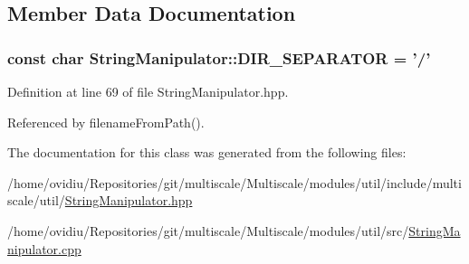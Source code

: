 \subsection{Member Data Documentation}
\hypertarget{classmultiscale_1_1StringManipulator_a3c975968005d8db010415d240b02b5db}{
\subsubsection[{D\-I\-R\-\_\-\-S\-E\-P\-A\-R\-A\-T\-O\-R}]{\setlength{\rightskip}{0pt plus 5cm}const char String\-Manipulator\-::\-D\-I\-R\-\_\-\-S\-E\-P\-A\-R\-A\-T\-O\-R = '/'\hspace{0.3cm}{\ttfamily [static]}}}\label{classmultiscale_1_1StringManipulator_a3c975968005d8db010415d240b02b5db}


Definition at line 69 of file String\-Manipulator.\-hpp.



Referenced by filename\-From\-Path().



The documentation for this class was generated from the following files\-:\begin{DoxyCompactItemize}
\item 
/home/ovidiu/\-Repositories/git/multiscale/\-Multiscale/modules/util/include/multiscale/util/\hyperlink{StringManipulator_8hpp}{String\-Manipulator.\-hpp}\item 
/home/ovidiu/\-Repositories/git/multiscale/\-Multiscale/modules/util/src/\hyperlink{StringManipulator_8cpp}{String\-Manipulator.\-cpp}\end{DoxyCompactItemize}
